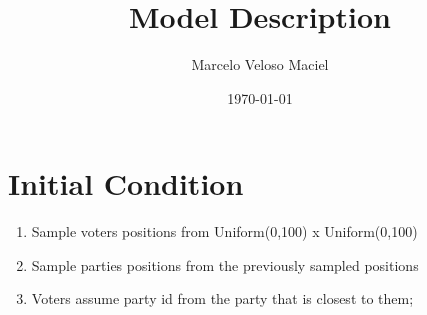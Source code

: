 \documentclass[11pt]{article}
\author{Marcelo Veloso Maciel}
\date{\today}
\title{Model Description}
\begin{document}
\maketitle
\tableofcontents


\section{Initial Condition}
\label{sec:orga7f82a7}
\begin{enumerate}
\item Sample voters positions from Uniform(0,100) x Uniform(0,100)
\item Sample parties positions from the previously sampled positions
\item Voters assume party id from the party that is closest to them;
\end{enumerate}
\end{document}
